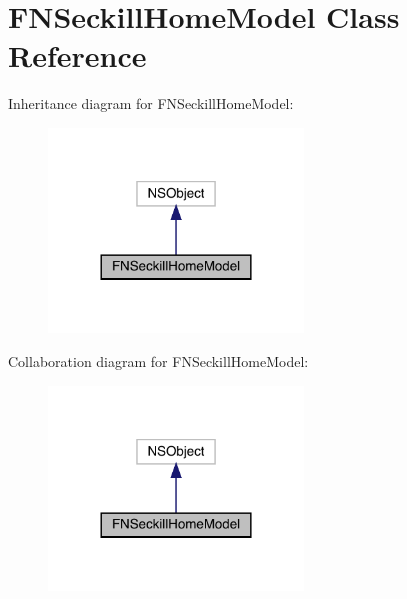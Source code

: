 \hypertarget{interface_f_n_seckill_home_model}{}\section{F\+N\+Seckill\+Home\+Model Class Reference}
\label{interface_f_n_seckill_home_model}


Inheritance diagram for F\+N\+Seckill\+Home\+Model\+:\nopagebreak
\begin{figure}[H]
\begin{center}
\leavevmode
\includegraphics[width=192pt]{interface_f_n_seckill_home_model__inherit__graph}
\end{center}
\end{figure}


Collaboration diagram for F\+N\+Seckill\+Home\+Model\+:\nopagebreak
\begin{figure}[H]
\begin{center}
\leavevmode
\includegraphics[width=192pt]{interface_f_n_seckill_home_model__coll__graph}
\end{center}
\end{figure}

